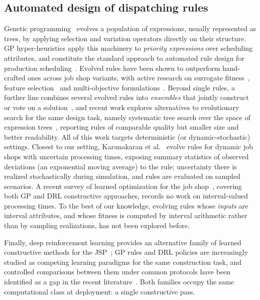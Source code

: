 \documentclass[review,authoryear,11pt]{elsarticle}
\begin{document}
\subsection{Automated design of dispatching rules}
Genetic programming~\citep{Koza1992,Poli2008} evolves a population of
expressions, usually represented as trees, by applying selection and
variation operators directly on their structure. GP hyper-heuristics apply this
machinery to \emph{priority expressions} over scheduling attributes, and
constitute the standard approach to automated rule design
for production scheduling~\citep{Branke2016,Nguyen2017}. Evolved rules
have been shown to outperform hand-crafted ones across job shop variants,
with active research on surrogate fitness~\citep{Hildebrandt2015}, feature
selection~\citep{Mei2017} and multi-objective
formulations~\citep{Nguyen2014}. Beyond single rules, a further line
combines several evolved rules into \emph{ensembles} that jointly
construct or vote on a solution~\citep{GilGala2021Ensembles}, and recent
work explores alternatives to evolutionary search for the same design
task, namely systematic tree search over the space of expression
trees~\citep{GilGala2025SSHE}, reporting rules of comparable quality but
smaller size and better readability. All of this work targets
deterministic (or dynamic-stochastic) settings. Closest to our setting,
Karunakaran et
al.~\citep{Karunakaran2017} evolve rules for dynamic job shops with
uncertain processing times, exposing summary statistics of observed
deviations (an exponential moving average) to the rule; uncertainty there
is realized stochastically during simulation, and rules are evaluated on
sampled scenarios. A recent survey of learned optimization for the job
shop~\citep{Xu2025}, covering both GP and DRL constructive approaches,
records no work on interval-valued processing times. To the best of our
knowledge, evolving rules whose \emph{inputs} are interval
attributes, and whose fitness is computed by interval arithmetic rather
than by sampling realizations, has not been explored before.

Finally, deep reinforcement learning provides an alternative family of
learned constructive methods for the
JSP~\citep{Zhang2020L2D,Park2021GNN}; GP rules and DRL policies are
increasingly studied as competing learning paradigms for the same
construction task, and controlled comparisons between them under common
protocols have been identified as a gap in the recent
literature~\citep{Xu2025}. Both families occupy the same computational
class at deployment: a single constructive pass.
\end{document}
